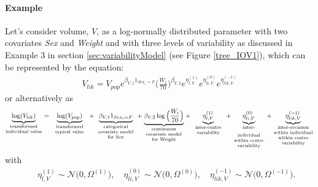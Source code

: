 \paragraph{Example}
Let's consider volume, $V$, as a log-normally distributed parameter with two covariates \textit{Sex} and \textit{Weight} and with three levels of variability as discussed in Example 3 in section \ref{sec:variabilityModel} (see Figure \ref{tree_IOV1}), which can be represented by the equation:
\begin{align*}
V_{lik} = V_{pop} e^{\beta_{V,1} 1_{Sex_i=F}} \Big(\frac{W_i}{70}\Big)^{\beta_{V,2}} e^{\eta_{l,V}^{(1)}}  e^{\eta_{li,V}^{(0)}} e^{\eta_{lik,V}^{(-1)}}
\end{align*}
or alternatively as
\begin{align*}
\underbrace{\log(V_{lik})}_{\text{\parbox{2cm}{\centering transformed\\[-4pt] individual value}}} =
\underbrace{\log(V_{pop})}_{\text{\parbox{2cm}{\centering transformed\\[-4pt] typical value}}} +
\underbrace{\beta_{V,1} 1_{Sex_i=F}}_{\text{\parbox{2.2cm}{\centering categorical\\[-4pt] covariate model\\[-4pt] for Sex}}}
+ \underbrace{\beta_{V,2} \log\Big(\frac{W_i}{70}\Big)}_{\text{\parbox{2.2cm}{\centering continuous\\[-4pt] covariate model\\[-4pt] for Weight}}}
+ \underbrace{\eta_{l,V}^{(1)}}_{\text{\parbox{1.8cm}{\centering inter-centre\\[-4pt]  variability}}}
+ \underbrace{\eta_{li,V}^{(0)}}_{\text{\parbox{1.8cm}{\centering inter-individual\\[-4pt] within centre \\[-4pt]  variability}}}
+ \underbrace{\eta_{lik,V}^{(-1)}}_{\text{\parbox{2.2cm}{\centering inter-occasion\\[-4pt] within individual \\[-4pt] within centre \\[-4pt] variability}}}
\end{align*}
with
\begin{align*}
 && \eta_{l,V}^{(1)} \sim \mathcal{N}\big(0,\Omega^{(1)}\big), \quad \eta_{li,V}^{(0)} \sim \mathcal{N}\big(0,\Omega^{(0)}\big),
\quad \eta_{lik,V}^{(-1)} \sim \mathcal{N}\big(0,\Omega^{(-1)}\big).
\end{align*}
